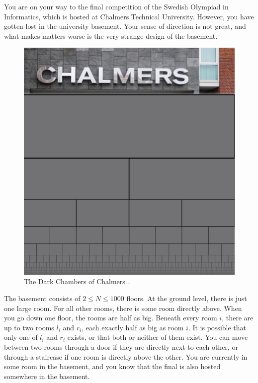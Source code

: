 You are on your way to the final competition of the Swedish Olympiad in Informatics, which is hosted at Chalmers Technical University.
However, you have gotten lost in the university basement.
Your sense of direction is not great, and what makes matters worse is the very strange design of the basement.

\begin{centering}
  \begin{figure}[h]
    \centering
    \includegraphics[scale=0.6]{chalmers_dark_chambers.png}
    \caption{The Dark Chambers of Chalmers...}
  \end{figure}
\end{centering}

The basement consists of $2 \leq N \leq 1000$ floors.
At the ground level, there is just one large room.
For all other rooms, there is some room directly above.
When you go down one floor, the rooms are half as big.
Beneath every room $i$, there are up to two rooms $l_i$ and $r_i$, each exactly half as big as room $i$.
It is possible that only one of $l_i$ and $r_i$ exists, or that both or neither of them exist.
You can move between two rooms through a door if they are directly next to each other,
or through a staircase if one room is directly above the other.
You are currently in some room in the basement, and you know that the final is also hosted somewhere in the basement.

